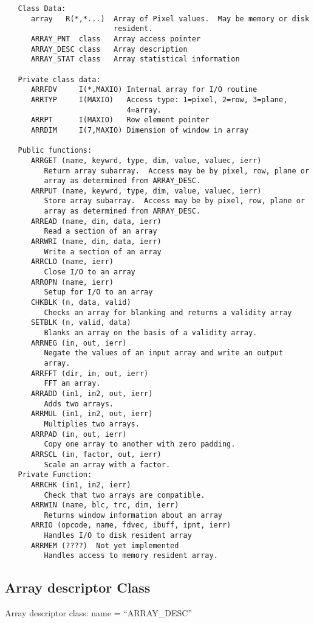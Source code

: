 {\small\begin{verbatim}
   Class Data:
      array   R(*,*...)  Array of Pixel values.  May be memory or disk
                         resident.
      ARRAY_PNT  class   Array access pointer
      ARRAY_DESC class   Array description
      ARRAY_STAT class   Array statistical information

   Private class data:
      ARRFDV     I(*,MAXIO) Internal array for I/O routine
      ARRTYP     I(MAXIO)   Access type: 1=pixel, 2=row, 3=plane,
                            4=array.
      ARRPT      I(MAXIO)   Row element pointer
      ARRDIM     I(7,MAXIO) Dimension of window in array

   Public functions:
      ARRGET (name, keywrd, type, dim, value, valuec, ierr)
         Return array subarray.  Access may be by pixel, row, plane or
         array as determined from ARRAY_DESC.
      ARRPUT (name, keywrd, type, dim, value, valuec, ierr)
         Store array subarray.  Access may be by pixel, row, plane or
         array as determined from ARRAY_DESC.
      ARREAD (name, dim, data, ierr)
         Read a section of an array
      ARRWRI (name, dim, data, ierr)
         Write a section of an array
      ARRCLO (name, ierr)
         Close I/O to an array
      ARROPN (name, ierr)
         Setup for I/O to an array
      CHKBLK (n, data, valid)
         Checks an array for blanking and returns a validity array
      SETBLK (n, valid, data)
         Blanks an array on the basis of a validity array.
      ARRNEG (in, out, ierr)
         Negate the values of an input array and write an output
         array.
      ARRFFT (dir, in, out, ierr)
         FFT an array.
      ARRADD (in1, in2, out, ierr)
         Adds two arrays.
      ARRMUL (in1, in2, out, ierr)
         Multiplies two arrays.
      ARRPAD (in, out, ierr)
         Copy one array to another with zero padding.
      ARRSCL (in, factor, out, ierr)
         Scale an array with a factor.
   Private Function:
      ARRCHK (in1, in2, ierr)
         Check that two arrays are compatible.
      ARRWIN (name, blc, trc, dim, ierr)
         Returns window information about an array
      ARRIO (opcode, name, fdvec, ibuff, ipnt, ierr)
         Handles I/O to disk resident array
      ARRMEM (????)  Not yet implemented
         Handles access to memory resident array.
\end{verbatim}}
\subsection{Array descriptor Class}
   Array descriptor class: name = ``ARRAY\_DESC''

